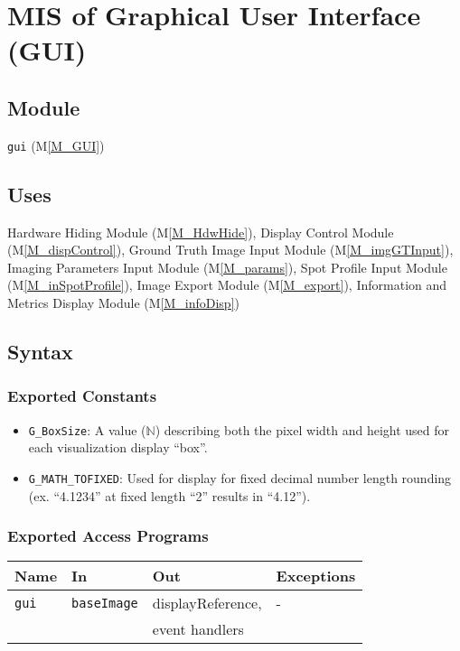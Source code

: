 \documentclass[12pt, titlepage]{article}
\newcommand{\mref}[1]{M\ref{#1}}
\newcommand{\mrefp}[1]{(\mref{#1})}
\newcommand{\mreff}[1]{Module \mrefp{#1}}
\newcommand{\code}[1]{\texttt{#1}}
\begin{document}
\section{MIS of Graphical User Interface (GUI)} \label{MS_GUI}

\subsection{Module}
\code{gui} \mrefp{M_GUI}

\subsection{Uses}
Hardware Hiding \mreff{M_HdwHide},
Display Control \mreff{M_dispControl},
Ground Truth Image Input \mreff{M_imgGTInput},
Imaging Parameters Input \mreff{M_params},
Spot Profile Input \mreff{M_inSpotProfile},
Image Export \mreff{M_export},
Information and Metrics Display \mreff{M_infoDisp}

\subsection{Syntax}

\subsubsection{Exported Constants}
\begin{itemize}
  \item \code{G\_BoxSize}: A value ($\mathbb{N}$) describing both the pixel width and height used for each visualization display ``box''.
  \item \code{G\_MATH\_TOFIXED}: Used for display for fixed decimal number length
    rounding (ex. ``4.1234'' at fixed length ``2'' results in ``4.12'').
\end{itemize}

\subsubsection{Exported Access Programs}

\begin{center}
\begin{tabular}{p{2cm} p{4cm} p{5cm} p{2cm}}
\hline
\textbf{Name} & \textbf{In} & \textbf{Out} & \textbf{Exceptions} \\
\hline
\code{gui} & \code{baseImage} & displayReference, & - \\
           &                  & event handlers \\
\hline
\end{tabular}
\end{center}
\end{document}
